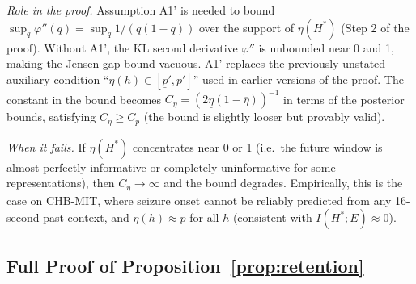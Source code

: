 \begin{enumerate}[label=\textbf{(A\arabic*)}]
  \emph{Role in the proof.} Assumption A1' is needed to bound $\sup_q \varphi''(q) = \sup_q 1/(q(1-q))$ over the support of $\eta(H^*)$ (Step 2 of the proof). Without A1', the KL second derivative $\varphi''$ is unbounded near 0 and 1, making the Jensen-gap bound vacuous. A1' replaces the previously unstated auxiliary condition ``$\eta(h) \in [\underline{p}', \overline{p}']$'' used in earlier versions of the proof. The constant in the bound becomes $C_\eta = (2\underline{\eta}(1-\overline{\eta}))^{-1}$ in terms of the posterior bounds, satisfying $C_\eta \geq C_p$ (the bound is slightly looser but provably valid).

  \emph{When it fails.} If $\eta(H^*)$ concentrates near 0 or 1 (i.e.\ the future window is almost perfectly informative or completely uninformative for some representations), then $C_\eta \to \infty$ and the bound degrades. Empirically, this is the case on CHB-MIT, where seizure onset cannot be reliably predicted from any 16-second past context, and $\eta(h) \approx p$ for all $h$ (consistent with $I(H^*; E) \approx 0$).
\end{enumerate}

\subsection{Full Proof of Proposition~\ref{prop:retention}}

